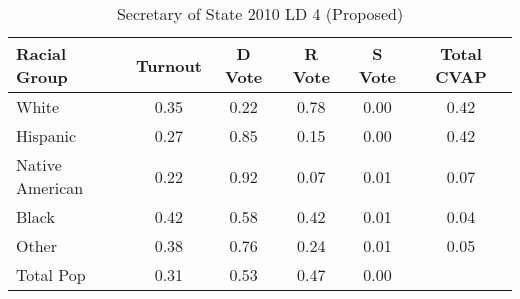 \begin{table}[htb]
\begin{center}
\caption{Secretary of State 2010 LD 4 (Proposed)}
\label{sos10_cvap_ld_4}
\begin{tabular}{lccccc}
  \hline
Racial Group & Turnout & D Vote & R Vote & S Vote & Total CVAP \\ 
  \hline
White & 0.35 & 0.22 & 0.78 & 0.00 & 0.42 \\ 
  Hispanic & 0.27 & 0.85 & 0.15 & 0.00 & 0.42 \\ 
  Native American & 0.22 & 0.92 & 0.07 & 0.01 & 0.07 \\ 
  Black & 0.42 & 0.58 & 0.42 & 0.01 & 0.04 \\ 
  Other & 0.38 & 0.76 & 0.24 & 0.01 & 0.05 \\ 
  Total Pop & 0.31 & 0.53 & 0.47 & 0.00 &  \\ 
   \hline
\end{tabular}
\end{center}
\end{table}
